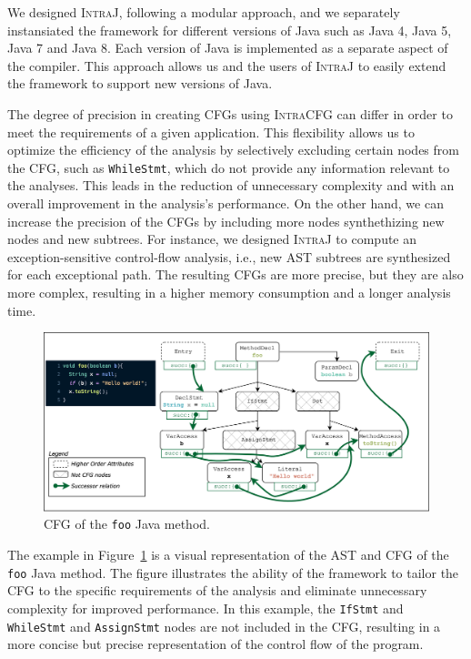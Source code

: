 We designed \textsc{IntraJ}, following a  modular approach, and we separately 
instansiated the framework for different versions of Java such as Java 4, 
Java 5, Java 7 and Java 8. Each version of Java is implemented as a separate
aspect of the compiler. This approach allows us and the users of \textsc{IntraJ}
to easily extend the framework to support new versions of Java.

The degree of precision in creating CFGs using \textsc{IntraCFG} can differ in order
to meet the requirements of a given application.
This flexibility allows us to optimize the efficiency of the analysis by selectively 
excluding certain nodes from the CFG, such as \texttt{WhileStmt}, which do not
provide any information relevant to the analyses. This leads in the reduction of
unnecessary complexity and with an overall improvement in the analysis's performance.
On the other hand, we can increase the precision of the CFGs by including more nodes
synthethizing new nodes and new subtrees. 
For instance, we designed \textsc{IntraJ} to compute an exception-sensitive 
control-flow analysis, i.e., new AST subtrees are synthesized for each exceptional path. 
The resulting CFGs are more precise, but they are also more complex, resulting 
in a higher memory consumption and a longer analysis time.
\begin{figure}[H]
	\centering
	\includegraphics[scale=0.08]{kappa/img/exampleAST.png}
	\caption{\label{fig:CFG} CFG of the \texttt{foo} Java method.}
\end{figure}
The example in Figure~\ref{fig:CFG} is a visual representation of the AST and CFG of the 
\texttt{foo} Java method. The figure illustrates the ability of the framework to tailor the CFG
to the specific requirements of the analysis and eliminate unnecessary complexity for improved performance.
In this example, the \texttt{IfStmt} and \texttt{WhileStmt} and \texttt{AssignStmt} nodes are not included in the CFG,
resulting in a more concise but precise representation of the control flow of the program.


